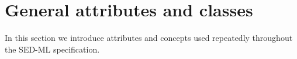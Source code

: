 \section{General attributes and classes}
In this section we introduce attributes and concepts used repeatedly throughout the SED-ML specification. 



















